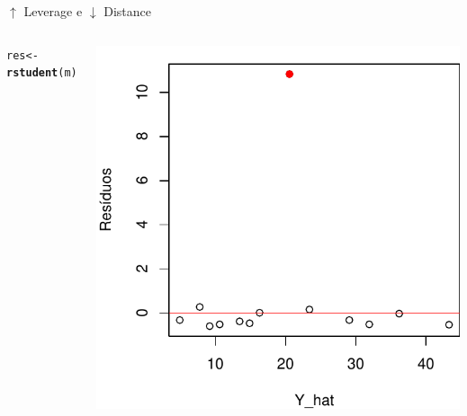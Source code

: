 \documentclass{beamer}\usepackage[]{graphicx}\usepackage[]{color}
\makeatletter
\newcommand{\hlstd}[1]{\textcolor[rgb]{0.345,0.345,0.345}{#1}}%
\newcommand{\hlkwb}[1]{\textcolor[rgb]{0.69,0.353,0.396}{#1}}%
\newcommand{\hlkwd}[1]{\textcolor[rgb]{0.737,0.353,0.396}{\textbf{#1}}}%
\newenvironment{kframe}{%
 \def\at@end@of@kframe{}%
 \ifinner\ifhmode%
  \def\at@end@of@kframe{\end{minipage}}%
  \begin{minipage}{\columnwidth}%
 \fi\fi%
 \def\FrameCommand##1{\hskip\@totalleftmargin \hskip-\fboxsep
 \colorbox{shadecolor}{##1}\hskip-\fboxsep
     \hskip-\linewidth \hskip-\@totalleftmargin \hskip\columnwidth}%
 \MakeFramed {\advance\hsize-\width
   \@totalleftmargin\z@ \linewidth\hsize
   \@setminipage}}%
 {\par\unskip\endMakeFramed%
 \at@end@of@kframe}
\newenvironment{knitrout}{}{} %
\renewenvironment{knitrout}{\setlength{\topsep}{0mm}}{}
\makeatother
\begin{document}
\begin{frame}{$\uparrow$ Leverage e $\downarrow$ Distance}
\begin{columns}[c]
\begin{knitrout}\tiny
{}\color{fgcolor}\begin{kframe}
\begin{alltt}
\hlstd{res} \hlkwb{<-} \hlkwd{rstudent}\hlstd{(m)}
\end{alltt}
\end{kframe}
\includegraphics[width=1\linewidth]{figure/inf204-1} 

\end{knitrout}

\end{columns}
\end{frame}
\end{document}
